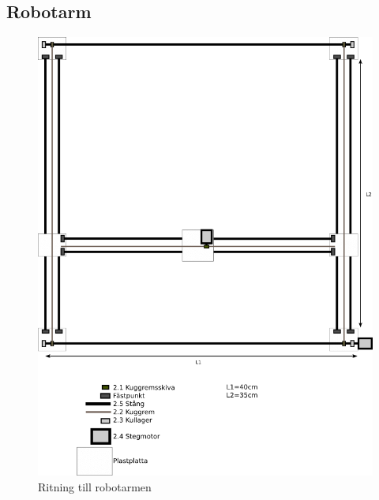 \documentclass[a4paper]{article}
\begin{document}
\begin{appendix}
\subsection{Robotarm}
\begin{figure}[!h]\label{arm}
\centering
\includegraphics[scale=0.6]{arm}
\caption{Ritning till robotarmen}
\end{figure}


\end{appendix}
\end{document}
